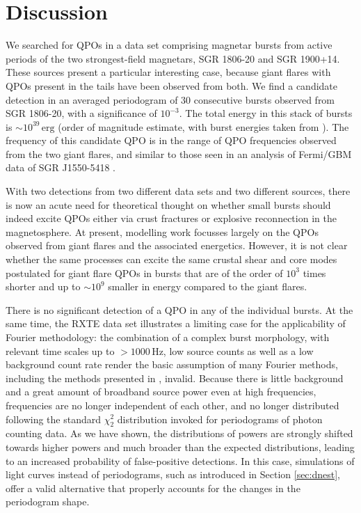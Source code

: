\documentclass[numberedappendix]{emulateapj}
\newcommand{\hz}{\,\mathrm{Hz}}
\begin{document}
\section{Discussion}
\label{sec:discussion}

We searched for QPOs in a data set comprising magnetar bursts from active periods of the two strongest-field magnetars, SGR 1806-20 and SGR 1900+14. These sources present a particular interesting case, because giant flares with QPOs present in the tails have been observed from both.
We find a candidate detection in an averaged periodogram of 30 consecutive bursts observed from SGR 1806-20, with a significance of $10^{-3}$. The total energy in this stack of bursts is $\sim 10^{39} \, \mathrm{erg}$ (order of magnitude estimate, with burst energies taken from \citealt{gogus2000}). The frequency of this candidate QPO is in the range of QPO frequencies observed from the two giant flares, and similar to those seen in an analysis of Fermi/GBM data of SGR J1550-5418 \citep{huppenkothen2014}. 

With two detections from two different data sets and two different sources, there is now an acute need for theoretical thought on whether small bursts should indeed excite QPOs either via crust fractures or explosive reconnection in the magnetosphere. At present, modelling work focusses largely on the QPOs observed from giant flares and the associated energetics. However, it is not clear whether the same processes can excite the same crustal shear and core modes postulated for giant flare QPOs in bursts that are of the order of $10^3$ times shorter and up to $\sim 10^{9}$ smaller in energy compared to the giant flares.

There is no significant detection of a QPO in any of the individual bursts. At the same time, the RXTE data set illustrates a limiting case for the applicability of Fourier methodology: the combination of a complex burst morphology, with relevant time scales up to $>1000 \hz$, low source counts as well as a low background 
count rate render the basic assumption of many Fourier methods, including the methods presented in \citep{huppenkothen2013}, invalid. Because there is little background and a great amount of broadband source power even at high frequencies, frequencies are no longer independent of each other, and no longer distributed following the standard $\chi^2_2$ distribution invoked for periodograms of photon counting data. As we have shown, the distributions of powers are strongly shifted towards higher powers and much broader than the expected distributions, leading to an increased probability of false-positive detections. In this case, simulations of light curves instead of periodograms, such as introduced in Section \ref{sec:dnest}, offer a valid alternative that properly accounts for the changes in the periodogram shape. 
\end{document}

